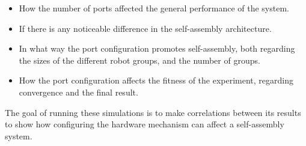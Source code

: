\begin{itemize}
	\item How the number of ports affected the general performance of the system.
	\item If there is any noticeable difference in the self-assembly architecture.
	\item In what way the port configuration promotes self-assembly, both regarding the sizes of the different robot groups, and the number of groups.
	\item How the port configuration affects the fitness of the experiment, regarding convergence and the final result.
\end{itemize}

The goal of running these simulations is to make correlations between its results to show how configuring the hardware mechanism can affect a self-assembly system.


